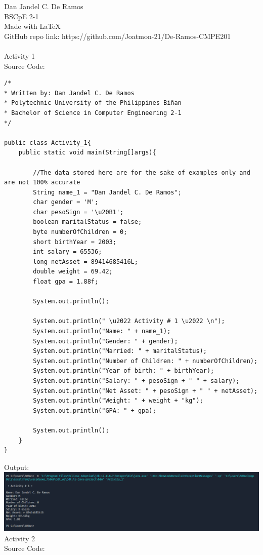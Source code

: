 \documentclass[12pt]{article}
\begin{document}
 
	\noindent
	Dan Jandel C. De Ramos\\
	BSCpE 2-1\\
	Made with \LaTeX \\
	GitHub repo link: https://github.com/Joatmon-21/De-Ramos-CMPE201\\
	\\
	Activity 1\\
	Source Code:
	\begin{verbatim}         
/*
* Written by: Dan Jandel C. De Ramos
* Polytechnic University of the Philippines Biñan
* Bachelor of Science in Computer Engineering 2-1
*/

public class Activity_1{
	public static void main(String[]args){         
			
		//The data stored here are for the sake of examples only and are not 100% accurate        
		String name_1 = "Dan Jandel C. De Ramos";        
		char gender = 'M';
		char pesoSign = '\u20B1';
		boolean maritalStatus = false;
		byte numberOfChildren = 0;
		short birthYear = 2003;
		int salary = 65536;  
		long netAsset = 89414685416L;
		double weight = 69.42;
		float gpa = 1.88f;
				
		System.out.println();
				
		System.out.println(" \u2022 Activity # 1 \u2022 \n");
		System.out.println("Name: " + name_1);
		System.out.println("Gender: " + gender);
		System.out.println("Married: " + maritalStatus);
		System.out.println("Number of Children: " + numberOfChildren);
		System.out.println("Year of birth: " + birthYear);
		System.out.println("Salary: " + pesoSign + " " + salary);
		System.out.println("Net Asset: " + pesoSign + " " + netAsset);
		System.out.println("Weight: " + weight + "kg");
		System.out.println("GPA: " + gpa);       
				
		System.out.println();        
	}
}
	\end{verbatim}
	\clearpage
	\noindent
	Output:\\
	\includegraphics[width=\textwidth]{output1}
	\clearpage
	\noindent
	Activity 2\\
	Source Code:
\end{document}
